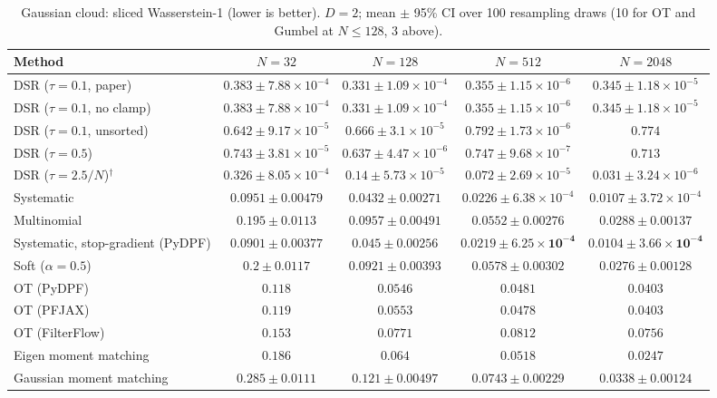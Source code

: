 \begin{table}[H]
\centering
\small
\caption{Gaussian cloud: sliced Wasserstein-1 (lower is better). $D{=}2$; mean $\pm$ 95\% CI over 100 resampling draws (10 for OT and Gumbel at $N\le128$, 3 above).}
\label{tab:static-gaussian-sliced_w1}
\begin{adjustbox}{max width=\linewidth}
\begin{tabular}{lcccc}
\toprule
Method & $N{=}32$ & $N{=}128$ & $N{=}512$ & $N{=}2048$ \\
\midrule
DSR ($\tau{=}0.1$, paper) & $0.383\pm7.88\times10^{-4}$ & $0.331\pm1.09\times10^{-4}$ & $0.355\pm1.15\times10^{-6}$ & $0.345\pm1.18\times10^{-5}$ \\
DSR ($\tau{=}0.1$, no clamp) & $0.383\pm7.88\times10^{-4}$ & $0.331\pm1.09\times10^{-4}$ & $0.355\pm1.15\times10^{-6}$ & $0.345\pm1.18\times10^{-5}$ \\
DSR ($\tau{=}0.1$, unsorted) & $0.642\pm9.17\times10^{-5}$ & $0.666\pm3.1\times10^{-5}$ & $0.792\pm1.73\times10^{-6}$ & $0.774$ \\
DSR ($\tau{=}0.5$) & $0.743\pm3.81\times10^{-5}$ & $0.637\pm4.47\times10^{-6}$ & $0.747\pm9.68\times10^{-7}$ & $0.713$ \\
DSR ($\tau{=}2.5/N$)$^\dagger$ & $0.326\pm8.05\times10^{-4}$ & $0.14\pm5.73\times10^{-5}$ & $0.072\pm2.69\times10^{-5}$ & $0.031\pm3.24\times10^{-6}$ \\
\midrule
Systematic & $0.0951\pm0.00479$ & $\mathbf{0.0432\pm0.00271}$ & $0.0226\pm6.38\times10^{-4}$ & $0.0107\pm3.72\times10^{-4}$ \\
Multinomial & $0.195\pm0.0113$ & $0.0957\pm0.00491$ & $0.0552\pm0.00276$ & $0.0288\pm0.00137$ \\
Systematic, stop-gradient (PyDPF) & $\mathbf{0.0901\pm0.00377}$ & $0.045\pm0.00256$ & $\mathbf{0.0219\pm6.25\times10^{-4}}$ & $\mathbf{0.0104\pm3.66\times10^{-4}}$ \\
Soft ($\alpha{=}0.5$) & $0.2\pm0.0117$ & $0.0921\pm0.00393$ & $0.0578\pm0.00302$ & $0.0276\pm0.00128$ \\
OT (PyDPF) & $0.118$ & $0.0546$ & $0.0481$ & $0.0403$ \\
OT (PFJAX) & $0.119$ & $0.0553$ & $0.0478$ & $0.0403$ \\
OT (FilterFlow) & $0.153$ & $0.0771$ & $0.0812$ & $0.0756$ \\
Eigen moment matching & $0.186$ & $0.064$ & $0.0518$ & $0.0247$ \\
Gaussian moment matching & $0.285\pm0.0111$ & $0.121\pm0.00497$ & $0.0743\pm0.00229$ & $0.0338\pm0.00124$ \\

\end{tabular}
\end{adjustbox}
\end{table}
